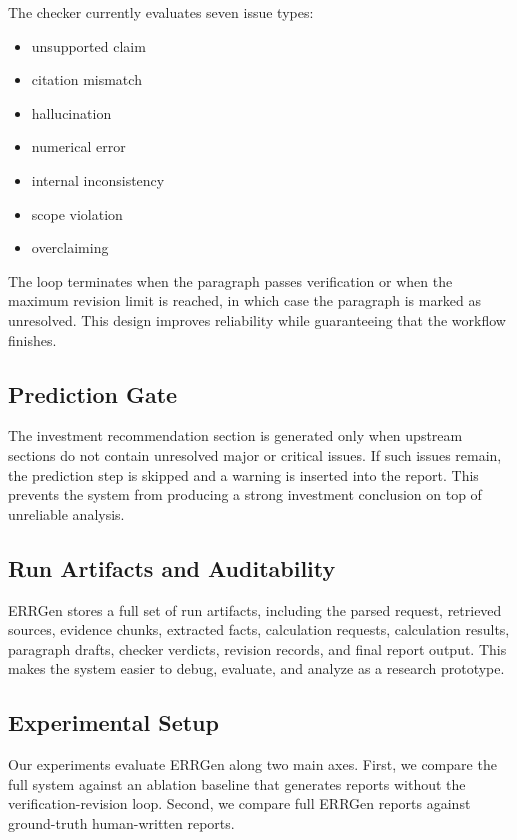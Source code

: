 \documentclass[11pt,a4paper]{article}
\begin{document}
The checker currently evaluates seven issue types:
\begin{itemize}[leftmargin=1.5em]
    \item unsupported claim
    \item citation mismatch
    \item hallucination
    \item numerical error
    \item internal inconsistency
    \item scope violation
    \item overclaiming
\end{itemize}

The loop terminates when the paragraph passes verification or when the maximum
revision limit is reached, in which case the paragraph is marked as unresolved.
This design improves reliability while guaranteeing that the workflow finishes.

\subsection{Prediction Gate}
The investment recommendation section is generated only when upstream sections
do not contain unresolved major or critical issues. If such issues remain, the
prediction step is skipped and a warning is inserted into the report. This
prevents the system from producing a strong investment conclusion on top of
unreliable analysis.

\subsection{Run Artifacts and Auditability}
ERRGen stores a full set of run artifacts, including the parsed request,
retrieved sources, evidence chunks, extracted facts, calculation requests,
calculation results, paragraph drafts, checker verdicts, revision records, and
final report output. This makes the system easier to debug, evaluate, and
analyze as a research prototype.

\subsection{Experimental Setup}
Our experiments evaluate ERRGen along two main axes. First, we compare the
full system against an ablation baseline that generates reports without the
verification-revision loop. Second, we compare full ERRGen reports against
ground-truth human-written reports.
\end{document}
